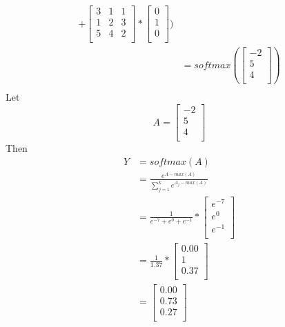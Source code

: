 \documentclass[
	12pt, %
]{fphw}
\begin{document}
\begin{equation}
\begin{split}
		+
		\begin{bmatrix}
			3	&	1	&	1\\
			1	&	2	&	3\\
			5	&	4	&	2\\
		\end{bmatrix}
		*
		\begin{bmatrix}
			0	\\
			1	\\
			0	\\
		\end{bmatrix}
	)\\
	&=softmax(
		\begin{bmatrix}
			-2	\\
			5	\\
			4	\\
		\end{bmatrix}
	)\\
\end{split}
\end{equation}
Let 
\begin{equation}
	A = 		
	\begin{bmatrix}
		-2	\\
		5	\\
		4	\\
	\end{bmatrix}
\end{equation}
Then
\begin{equation}
	\begin{split}
		Y &= softmax(A)\\
		&= \frac{e^{A-max(A)}}{\sum^k_{j=1}e^{A_j-max(A)}}\\
		&= \frac{1}{e^{-7}+e^{0}+e^{-1}}*
			\begin{bmatrix}
				e^{-7}	\\
				e^{0}	\\
				e^{-1}	\\
			\end{bmatrix}\\
		&= \frac{1}{1.37}*
			\begin{bmatrix}
				0.00	\\
				1		\\
				0.37	\\
			\end{bmatrix}\\
		&= 
			\begin{bmatrix}
				0.00	\\
				0.73		\\
				0.27	\\
			\end{bmatrix}
	\end{split}
\end{equation}
\end{document}

